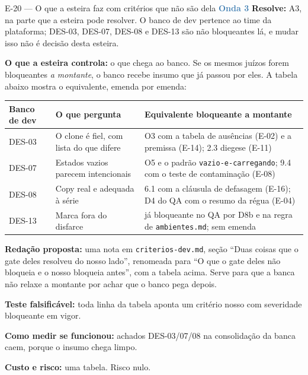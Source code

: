 \documentclass[11pt,a4paper]{article}
\newcommand{\onda}[1]{\textcolor{SteelBlue}{\textbf{Onda #1}}}
\begin{document}
\begin{emendabox}{E-20 --- O que a esteira faz com critérios que não são dela \hfill \onda{3}}
\textbf{Resolve:} A3, na parte que a esteira pode resolver. O banco de dev pertence ao time da
plataforma; DES-03, DES-07, DES-08 e DES-13 são não bloqueantes lá, e mudar isso não é decisão
desta esteira.

\textbf{O que a esteira controla:} o que chega ao banco. Se os mesmos juízos forem bloqueantes
\emph{a montante}, o banco recebe insumo que já passou por eles. A tabela abaixo mostra o
equivalente, emenda por emenda:

\begin{center}\small
\begin{tabular}{@{}p{2.2cm} p{5.6cm} p{6.8cm}@{}}
\toprule
\textbf{Banco de dev} & \textbf{O que pergunta} & \textbf{Equivalente bloqueante a montante} \\
\midrule
DES-03 & O clone é fiel, com lista do que difere & O3 com a tabela de ausências (E-02) e a
premissa (E-14); 2.3 diegese (E-11) \\
DES-07 & Estados vazios parecem intencionais & O5 e o padrão \texttt{vazio-e-carregando}; 9.4 com
o teste de contaminação (E-08) \\
DES-08 & Copy real e adequada à série & 6.1 com a cláusula de defasagem (E-16); D4 do QA com o
resumo da régua (E-04) \\
DES-13 & Marca fora do disfarce & já bloqueante no QA por D8b e na regra de
\texttt{ambientes.md}; sem emenda \\
\bottomrule
\end{tabular}
\end{center}

\textbf{Redação proposta:} uma nota em \texttt{criterios-dev.md}, seção ``Duas coisas que o gate
deles resolveu do nosso lado'', renomeada para ``O que o gate deles não bloqueia e o nosso
bloqueia antes'', com a tabela acima. Serve para que a banca não relaxe a montante por achar que
o banco pega depois.

\textbf{Teste falsificável:} toda linha da tabela aponta um critério nosso com severidade
bloqueante em vigor.

\textbf{Como medir se funcionou:} achados DES-03/07/08 na consolidação da banca caem, porque o
insumo chega limpo.

\textbf{Custo e risco:} uma tabela. Risco nulo.
\end{emendabox}

\end{document}
